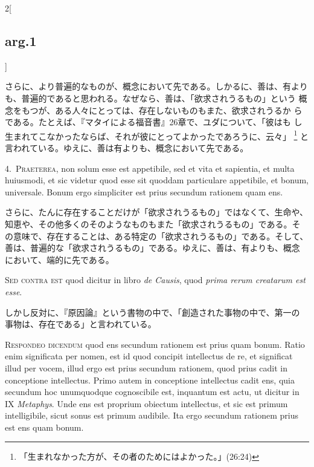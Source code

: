\documentclass[paper=a4paper,fontsize=10pt,jafontsize=9pt,titlepage]{jlreq}
\begin{document}
\begin{paracol}{2}[\subsection{arg.1}]
\switchcolumn

さらに、より普遍的なものが、概念において先である。しかるに、善は、有より
 も、普遍的であると思われる。なぜなら、善は、「欲求されうるもの」という
 概念をもつが、ある人々にとっては、存在しないものもまた、欲求されうるか
 らである。たとえば、『マタイによる福音書』26章で、ユダについて、「彼はも
 し生まれてこなかったならば、それが彼にとってよかったであろうに、云々」
 \footnote{「生まれなかった方が、その者のためにはよかった。」(26:24)}
 と言われている。ゆえに、善は有よりも、概念において先である。


4.~{\scshape Praeterea}, non solum esse est appetibile, sed et vita et
 sapientia, et multa huiusmodi, et sic videtur quod esse sit quoddam
 particulare appetibile, et bonum, universale. Bonum ergo simpliciter
 est prius secundum rationem quam ens.

\switchcolumn

さらに、たんに存在することだけが「欲求されうるもの」ではなくて、生命や、
 知恵や、その他多くのそのようなものもまた「欲求されうるもの」である。そ
 の意味で、存在することは、ある特定の「欲求されうるもの」である。そして、
 善は、普遍的な「欲求されうるもの」である。ゆえに、善は、有よりも、概念
 において、端的に先である。

\switchcolumn*[\subsection{s.c.}]

{\scshape Sed contra est} quod dicitur in libro {\itshape de Causis},
 quod {\itshape prima rerum creatarum est esse}.

\switchcolumn

しかし反対に、『原因論』という書物の中で、「創造された事物の中で、第一の
 事物は、存在である」と言われている。


{\scshape Respondeo dicendum} quod ens secundum rationem est prius quam
 bonum. Ratio enim significata per nomen, est id quod concipit
 intellectus de re, et significat illud per vocem, illud ergo est prius
 secundum rationem, quod prius cadit in conceptione intellectus. Primo
 autem in conceptione intellectus cadit ens, quia secundum hoc
 unumquodque cognoscibile est, inquantum est actu, ut dicitur in IX
 {\itshape Metaphys}. Unde ens est proprium obiectum intellectus, et sic
 est primum intelligibile, sicut sonus est primum audibile. Ita ergo
 secundum rationem prius est ens quam bonum.


\end{paracol}
\end{document}
